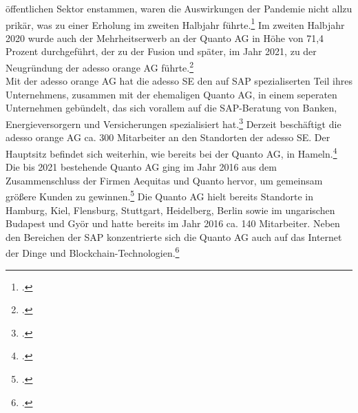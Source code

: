 öffentlichen Sektor enstammen, waren die Auswirkungen der Pandemie nicht allzu prikär, was zu einer Erholung im zweiten Halbjahr führte.\footcite[Vgl.][S. 30f]{adesso2020-report} Im zweiten Halbjahr 2020 wurde auch der Mehrheitserwerb an der Quanto AG in Höhe von 71,4 Prozent durchgeführt, der zu der Fusion und später, im Jahr 2021, zu der Neugründung der adesso orange AG führte.\footcite[Vgl.][S. 15]{adesso2020-report} 
\\Mit der adesso orange AG hat die adesso SE den auf SAP spezialiserten Teil ihres Unternehmens, zusammen mit der ehemaligen Quanto AG, in einem seperaten Unternehmen gebündelt, das sich vorallem auf die SAP-Beratung von Banken, Energieversorgern und Versicherungen spezialisiert hat.\footcite[Vgl.][]{ao-main} Derzeit beschäftigt die adesso orange AG ca. 300 Mitarbeiter an den Standorten der adesso SE. Der Hauptsitz befindet sich weiterhin, wie bereits bei der Quanto AG, in Hameln.\footcite[Vgl.][]{ao-karriere}
Die bis 2021 bestehende Quanto AG ging im Jahr 2016 aus dem Zusammenschluss der Firmen \glqq{}Aequitas\grqq{} und \glqq{}Quanto\grqq{} hervor, um gemeinsam größere Kunden zu gewinnen.\footcite[Vgl.][]{ww-quanto} Die Quanto AG hielt bereits Standorte in Hamburg, Kiel, Flensburg, Stuttgart, Heidelberg, Berlin sowie im ungarischen Budapest und Györ und hatte bereits im Jahr 2016 ca. 140 Mitarbeiter. Neben den Bereichen der SAP konzentrierte sich die Quanto AG auch auf das \glqq{}Internet der Dinge\grqq{} und Blockchain-Technologien.\footcite[Vgl.][]{ww-quanto}

